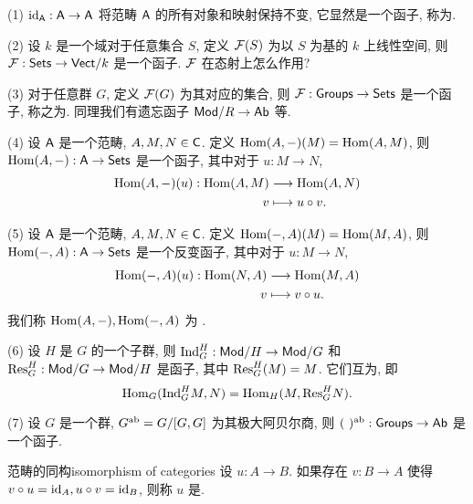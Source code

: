 \begin{example}
(1) $\id_\cA:\cA\to \cA$ 将范畴 $\cA$ 的所有对象和映射保持不变, 它显然是一个函子, 称为.

(2) 设 $k$ 是一个域对于任意集合 $S$, 定义 $\CF(S)$ 为以 $S$ 为基的 $k$ 上线性空间, 则 $\CF:\cSets\to\cVect/k$ 是一个函子. $\CF$ 在态射上怎么作用?

(3) 对于任意群 $G$, 定义 $\CF(G)$ 为其对应的集合, 则 $\CF:\cGroups\to\cSets$ 是一个函子, 称之为. 同理我们有遗忘函子 $\cMod/R\to\cAb$ 等.

(4) 设 $\cA$ 是一个范畴, $A,M,N\in\cC$. 定义 $\Hom(A,-)(M)=\Hom(A,M)$, 则 $\Hom(A,-):\cA\to\cSets$ 是一个函子, 其中对于 $u:M\to N$, 
  \[\fct{\Hom(A,-)(u):\Hom(A,M)}{\Hom(A,N)}{v}{u\circ v.}\]

(5) 设 $\cA$ 是一个范畴, $A,M,N\in\cC$. 定义 $\Hom(-,A)(M)=\Hom(M,A)$, 则 $\Hom(-,A):\cA\to\cSets$ 是一个反变函子, 其中对于 $u:M\to N$, 
  \[\fct{\Hom(-,A)(u):\Hom(N,A)}{\Hom(M,A)}{v}{v\circ u.}\]
我们称 $\Hom(A,-),\Hom(-,A)$ 为 .

(6) 设 $H$ 是 $G$ 的一个子群, 则 $\Ind_G^H:\cMod/H\to\cMod/G$ 和 $\Res_G^H:\cMod/G\to\cMod/H$ 是函子, 其中 $\Res_G^H(M)=M$. 它们互为, 即 
  \[\Hom_G(\Ind_G^H M,N)=\Hom_H(M,\Res_G^H N).\]

(7) 设 $G$ 是一个群, $G^\ab=G/[G,G]$ 为其极大阿贝尔商, 则 $(~)^\ab:\cGroups\to \cAb$ 是一个函子.
\end{example}

\begin{definition}{范畴的同构}{isomorphism of categories}
设 $u:A\to B$. 如果存在 $v:B\to A$ 使得 $v\circ u=\id_A,u\circ v=\id_B$, 则称 $u$ 是.
\end{definition}

